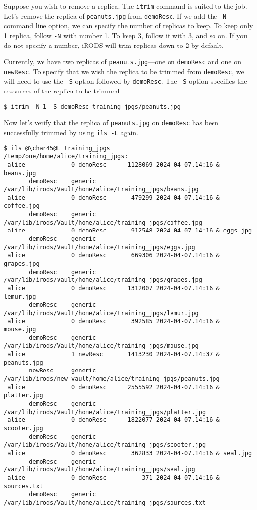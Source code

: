\documentclass[10pt,oneside]{memoir}
\begin{document}
Suppose you wish to remove a replica. The \texttt{itrim} command is suited to the job. Let's remove the replica of \texttt{peanuts.jpg} from \texttt{demoResc}. If we add the \texttt{-N} command line option, we can specify the number of replicas to keep. To keep only 1 replica, follow \texttt{-N} with number 1. To keep 3, follow it with 3, and so on. If you do not specify a number, iRODS will trim replicas down to 2 by default.


Currently, we have two replicas of \texttt{peanuts.jpg}---one on \texttt{demoResc} and one on \texttt{newResc}. To specify that we wish the replica to be trimmed from \texttt{demoResc}, we will need to use the \texttt{-S} option followed by \texttt{demoResc}. The \texttt{-S} option specifies the resources of the replica to be trimmed.

\begin{lstlisting}
$ itrim -N 1 -S demoResc training_jpgs/peanuts.jpg
\end{lstlisting}

Now let's verify that the replica of \texttt{peanuts.jpg} on \texttt{demoResc} has been successfully trimmed by using \texttt{ils -L} again.

\begin{lstlisting}[basicstyle=\tiny\ttfamily]
$ ils @\char45@L training_jpgs
/tempZone/home/alice/training_jpgs:
 alice             0 demoResc      1128069 2024-04-07.14:16 & beans.jpg
       demoResc    generic    /var/lib/irods/Vault/home/alice/training_jpgs/beans.jpg
 alice             0 demoResc       479299 2024-04-07.14:16 & coffee.jpg
       demoResc    generic    /var/lib/irods/Vault/home/alice/training_jpgs/coffee.jpg
 alice             0 demoResc       912548 2024-04-07.14:16 & eggs.jpg
       demoResc    generic    /var/lib/irods/Vault/home/alice/training_jpgs/eggs.jpg
 alice             0 demoResc       669306 2024-04-07.14:16 & grapes.jpg
       demoResc    generic    /var/lib/irods/Vault/home/alice/training_jpgs/grapes.jpg
 alice             0 demoResc      1312007 2024-04-07.14:16 & lemur.jpg
       demoResc    generic    /var/lib/irods/Vault/home/alice/training_jpgs/lemur.jpg
 alice             0 demoResc       392585 2024-04-07.14:16 & mouse.jpg
       demoResc    generic    /var/lib/irods/Vault/home/alice/training_jpgs/mouse.jpg
 alice             1 newResc       1413230 2024-04-07.14:37 & peanuts.jpg
       newResc     generic    /var/lib/irods/new_vault/home/alice/training_jpgs/peanuts.jpg
 alice             0 demoResc      2555592 2024-04-07.14:16 & platter.jpg
       demoResc    generic    /var/lib/irods/Vault/home/alice/training_jpgs/platter.jpg
 alice             0 demoResc      1822077 2024-04-07.14:16 & scooter.jpg
       demoResc    generic    /var/lib/irods/Vault/home/alice/training_jpgs/scooter.jpg
 alice             0 demoResc       362833 2024-04-07.14:16 & seal.jpg
       demoResc    generic    /var/lib/irods/Vault/home/alice/training_jpgs/seal.jpg
 alice             0 demoResc          371 2024-04-07.14:16 & sources.txt
       demoResc    generic    /var/lib/irods/Vault/home/alice/training_jpgs/sources.txt
\end{lstlisting}
\end{document}
